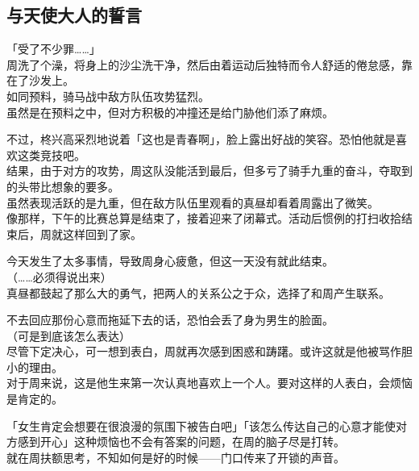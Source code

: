 \subsection{与天使大人的誓言}

「受了不少罪……」\\

周洗了个澡，将身上的沙尘洗干净，然后由着运动后独特而令人舒适的倦怠感，靠在了沙发上。\\

如同预料，骑马战中敌方队伍攻势猛烈。\\

虽然是在预料之中，但对方积极的冲撞还是给门胁他们添了麻烦。

不过，柊兴高采烈地说着「这也是青春啊」，脸上露出好战的笑容。恐怕他就是喜欢这类竞技吧。\\

结果，由于对方的攻势，周这队没能活到最后，但多亏了骑手九重的奋斗，夺取到的头带比想象的要多。\\

虽然表现活跃的是九重，但在敌方队伍里观看的真昼却看着周露出了微笑。\\

像那样，下午的比赛总算是结束了，接着迎来了闭幕式。活动后惯例的打扫收拾结束后，周就这样回到了家。

今天发生了太多事情，导致周身心疲惫，但这一天没有就此结束。\\

（……必须得说出来）\\

真昼都鼓起了那么大的勇气，把两人的关系公之于众，选择了和周产生联系。

不去回应那份心意而拖延下去的话，恐怕会丢了身为男生的脸面。\\

（可是到底该怎么表达）\\

尽管下定决心，可一想到表白，周就再次感到困惑和踌躇。或许这就是他被骂作胆小的理由。\\

对于周来说，这是他生来第一次认真地喜欢上一个人。要对这样的人表白，会烦恼是肯定的。

「女生肯定会想要在很浪漫的氛围下被告白吧」「该怎么传达自己的心意才能使对方感到开心」这种烦恼也不会有答案的问题，在周的脑子尽是打转。\\

就在周扶额思考，不知如何是好的时候——门口传来了开锁的声音。\\


